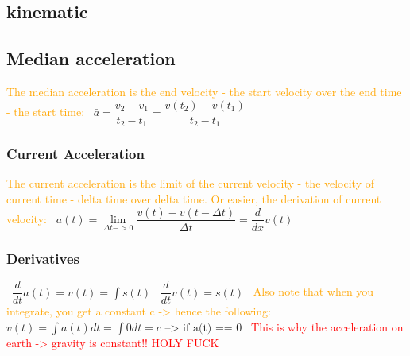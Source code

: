\documentclass[main.tex,fontsize=8pt,paper=a4,paper=portrait,DIV=calc,]{scrartcl}
\begin{document}
\begin{multicols*}{2}
\section{kinematic}
\subsection{Median acceleration}
\textcolor{orange}{The median acceleration is the end velocity - the start velocity over the end time - the start time:}\newline
\, \newline
\large \( \overset{\_}{a} = \dfrac{v_2 - v_1}{t_2 - t_1} = \dfrac{v(t_2) - v(t_1)}{t_2 - t_1} \) \newline
\normalsize 

\subsubsection{Current Acceleration}
\textcolor{orange}{The current acceleration is the limit of the current velocity - the velocity of current time - delta time over delta time. \newline
Or easier, the derivation of current velocity:}\newline
\, \newline
\large \( a(t) = \underset{\Delta t -> 0}{\lim} \dfrac{v(t) - v(t - \Delta t)}{\Delta t} = \dfrac{d}{dx}v(t)\) \newline
\normalsize

\subsubsection{Derivatives}
\, \newline
\large \(\dfrac{d}{dt}a(t) = v(t) = \int{s(t)} \)\newline
\, \newline
\large \(\dfrac{d}{dt}v(t) = s(t)\)\newline
\, \newline
\normalsize \textcolor{orange}{Also note that when you integrate, you get a constant c -> hence the following:}\newline
\, \newline
\large \( v(t) = \int{a(t) dt} = \int{0 dt} = c \text{ --> if a(t) == 0}\) \newline
\, \newline
\normalsize \textcolor{red}{This is why the acceleration on earth -> gravity is constant!! HOLY FUCK}


\end{multicols*}
\end{document}

